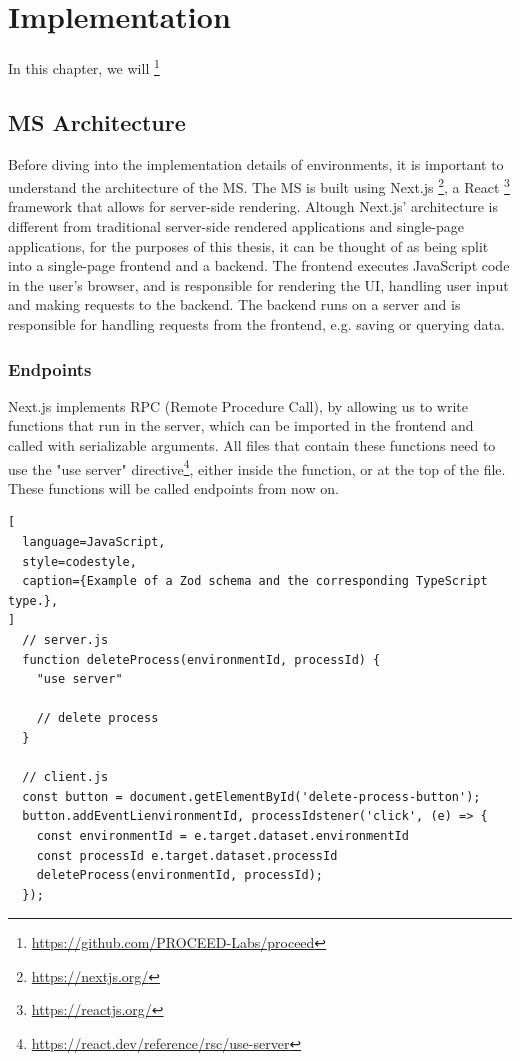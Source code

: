 \chapter{Implementation}
\label{cha:implementation}

In this chapter, we will
\footnote{\url{https://github.com/PROCEED-Labs/proceed}}

\section {MS Architecture}
\label{cha:ms-architecture}

Before diving into the implementation details of environments, it is important to
understand the architecture of the MS.
The MS is built using Next.js \footnote{\url{https://nextjs.org/}}, a React \footnote{\url{https://reactjs.org/}}
framework that allows for server-side rendering.
Altough Next.js' architecture is different from traditional server-side rendered
applications and single-page applications,
for the purposes of this thesis,
it can be thought of as being split into a single-page frontend and a backend.
The frontend executes JavaScript code in the user's browser, and is
responsible for rendering the UI, handling user input and making requests to the backend.
The backend runs on a server and is responsible for handling requests from the frontend,
e.g. saving or querying data.

\subsection{Endpoints}
\label{cha:ms-architecture:endpoints}

Next.js implements RPC (Remote Procedure Call), by allowing us to write functions that run
in the server, which can be imported in the frontend and called with serializable arguments.
All files that contain these functions need to use the "use server"
directive\footnote{\url{https://react.dev/reference/rsc/use-server}}, either inside the
function, or at the top of the file.
These functions will be called endpoints from now on.

\begin{lstlisting}[
  language=JavaScript,
  style=codestyle,
  caption={Example of a Zod schema and the corresponding TypeScript type.},
]
  // server.js
  function deleteProcess(environmentId, processId) {
    "use server"

    // delete process
  }

  // client.js
  const button = document.getElementById('delete-process-button');
  button.addEventLienvironmentId, processIdstener('click', (e) => {
    const environmentId = e.target.dataset.environmentId
    const processId e.target.dataset.processId
    deleteProcess(environmentId, processId);
  });
\end{lstlisting}



